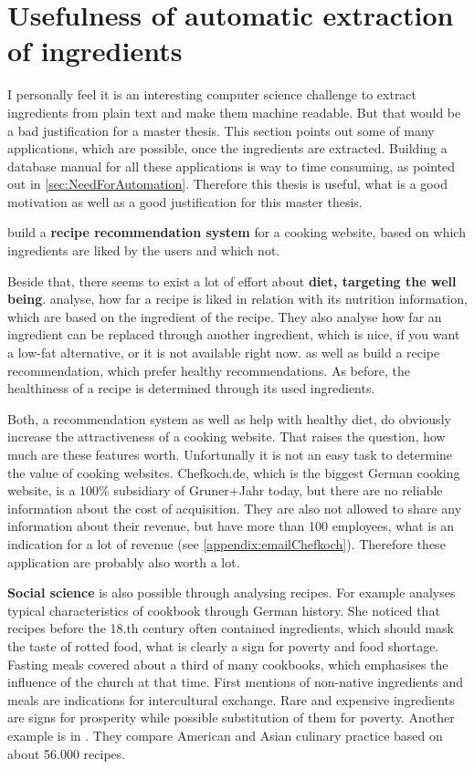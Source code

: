 \documentclass[12pt, twoside]{report}
\begin{document}
\section{Usefulness of automatic extraction of ingredients}\label{sec:UsefulnessOfThesis}
I personally feel it is an interesting computer science challenge to extract ingredients from plain text and make them machine readable. But that would be a bad justification for a master thesis. This section points out some of many applications, which are possible, once the ingredients are extracted. Building a database manual for all these applications is way to time consuming, as pointed out in \ref{sec:NeedForAutomation}. Therefore this thesis is useful, what is a good motivation as well as a good justification for this master thesis.

\parencite{recipeRecommendation} build a \textbf{recipe recommendation system} for a cooking website, based on which ingredients are liked by the users and which not.

Beside that, there seems to exist a lot of effort about \textbf{diet, targeting the well being}. \parencite{ingredientNetworks} analyse, how far a recipe is liked in relation with its nutrition information, which are based on the ingredient of the recipe. They also analyse how far an ingredient can be replaced through another ingredient, which is nice, if you want a low-fat alternative, or it is not available right now. \parencite{Freyne2010} as well as \parencite{Geleijnse_extractingvegetable} build a recipe recommendation, which prefer healthy recommendations. As before, the healthiness of a recipe is determined through its used ingredients.

Both, a recommendation system as well as help with healthy diet, do obviously increase the attractiveness of a cooking website. That raises the question, how much are these features worth. Unfortunally it is not an easy task to determine the value of cooking websites. Chefkoch.de, which is the biggest German cooking website, is a 100\% subsidiary of Gruner+Jahr today, but there are no reliable information about the cost of acquisition. They are also not allowed to share any information about their revenue, but have more than 100 employees, what is an indication for a lot of revenue (see \cref{appendix:emailChefkoch}). Therefore these application are probably also worth a lot.


\textbf{Social science} is also possible through analysing recipes. For example \parencite{BeateHenning} analyses typical characteristics of cookbook through German history. She noticed that recipes before the 18.th century often contained ingredients, which should mask the taste of rotted food, what is clearly a sign for poverty and food shortage. Fasting meals covered about a third of many cookbooks, which emphasises the influence of the church at that time. First mentions of non-native ingredients and meals are indications for intercultural exchange. Rare and expensive ingredients are signs for prosperity while possible substitution of them for poverty. Another example is in \parencite{FlavorNetwork}. They compare American and Asian culinary practice based on about 56.000 recipes.
\end{document}
